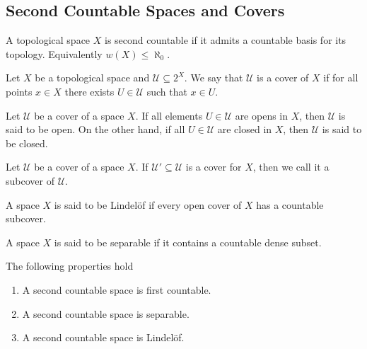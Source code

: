 \subsection{Second Countable Spaces and Covers}

\begin{definition}\label{def: second countable}
  A topological space \(X\) is second countable if it admits a countable basis
  for its topology. Equivalently \(w(X) \leq \aleph_0\).
\end{definition}

\begin{definition}[Cover]\label{def: cover}
  Let \(X\) be a topological space and \(\mathcal U \subseteq 2^X\). We say that
  \(\mathcal U\) is a cover of \(X\) if for all points \(x \in X\) there exists
  \(U \in \mathcal U\) such that \(x \in U\).
\end{definition}

\begin{definition}
  Let \(\mathcal U\) be a cover of a space \(X\). If all elements \(U \in
  \mathcal U\) are opens in \(X\), then \(\mathcal U\) is said to be open. On
  the other hand, if all \(U \in \mathcal U\) are closed in \(X\), then
  \(\mathcal U\) is said to be closed.
\end{definition}

\begin{definition}[Subcover]
  Let \(\mathcal U\) be a cover of a space \(X\). If \(\mathcal U' \subseteq
  \mathcal U\) is a cover for \(X\), then we call it a subcover of \(\mathcal
  U\).
\end{definition}

\begin{definition}
  A space \(X\) is said to be Lindelöf if every open cover of \(X\) has a
  countable subcover.
\end{definition}

\begin{definition}
  A space \(X\) is said to be separable if it contains a countable dense subset.
\end{definition}

\begin{proposition}
  \label{prop: second countable properties}
  The following properties hold
  \begin{enumerate}[(SC1)]
    \item A second countable space is first countable.
    \item A second countable space is separable.
    \item A second countable space is Lindelöf.
  \end{enumerate}
\end{proposition}

